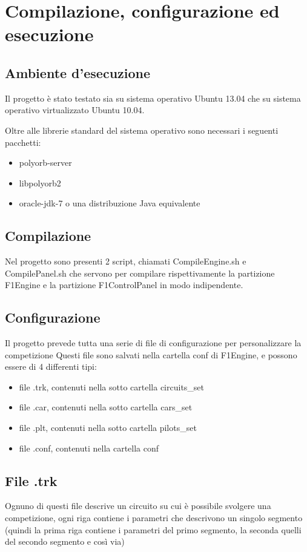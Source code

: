 \documentclass[a4paper,11pt, twoside, openright]{book}
\begin{document}
  \chapter{Compilazione, configurazione ed esecuzione}
    \section{Ambiente d'esecuzione}
      Il progetto è stato testato sia su sistema operativo Ubuntu 13.04 che su sistema operativo virtualizzato Ubuntu 10.04.
      
      Oltre alle librerie standard del sistema operativo sono necessari i seguenti pacchetti:
      \begin{itemize}
        \item polyorb-server
	\item libpolyorb2
	\item oracle-jdk-7 o una distribuzione Java equivalente
      \end{itemize}

    \section{Compilazione}
      Nel progetto sono presenti 2 script, chiamati CompileEngine.sh e CompilePanel.sh
      che servono per compilare rispettivamente la partizione F1Engine e la partizione F1ControlPanel
      in modo indipendente.
      
    \section{Configurazione}
      Il progetto prevede tutta una serie di file di configurazione per personalizzare la competizione
      Questi file sono salvati nella cartella conf di F1Engine, e possono essere di 4 differenti tipi:
      
      \begin{itemize}
	\item file .trk, contenuti nella sotto cartella circuits\_set 
	\item file .car, contenuti nella sotto cartella cars\_set
	\item file .plt, contenuti nella sotto cartella pilots\_set
	\item file .conf, contenuti nella cartella conf
      \end{itemize}
      
      \section{File .trk}
	Ognuno di questi file descrive un circuito su cui è possibile svolgere una competizione, ogni riga contiene i parametri
	che descrivono un singolo segmento (quindi la prima riga contiene i parametri del primo segmento, la seconda
	quelli del secondo segmento e così via)
	
\end{document}
